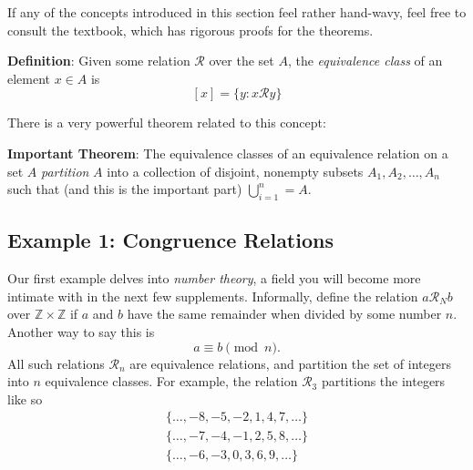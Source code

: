 \documentclass{article}
\begin{document}
    If any of the concepts introduced in this section feel rather hand-wavy, feel free to consult the textbook, which has rigorous proofs for the theorems.

    \vspace{2mm}
    \textbf{Definition}: Given some relation $\mathcal{R}$ over the set $A$, the \textit{equivalence class} of an element $x \in A$ is $$[x] = \{y : x \mathcal{R} y\}$$

    There is a very powerful theorem related to this concept:

    \vspace{2mm}
    \textbf{Important Theorem}: The equivalence classes of an equivalence relation on a set $A$ \textit{partition} $A$ into a collection of disjoint, nonempty subsets $A_{1}, A_{2}, \dots, A_{n}$ such that (and this is the important part) $\bigcup _{i = 1}^{n} = A$.

    \subsection*{Example 1: Congruence Relations}
        Our first example delves into \textit{number theory}, a field you will become more intimate with in the next few supplements. Informally, define the relation $a\mathcal{R}_{N}b$ over $\mathbb{Z} \times \mathbb{Z}$ if $a$ and $b$ have the same remainder when divided by some number $n$. Another way to say this is $$a \equiv b \pmod{n}.$$ All such relations $\mathcal{R}_{n}$ are equivalence relations, and partition the set of integers into $n$ equivalence classes. For example, the relation $\mathcal{R}_{3}$ partitions the integers like so
        \begin{gather}
            \{\dots, -8, -5, -2, 1, 4, 7, \dots\} \\
            \{\dots, -7, -4, -1, 2, 5, 8, \dots\} \\
            \{\dots, -6, -3, 0, 3, 6, 9, \dots\}
        \end{gather}




\end{document}
